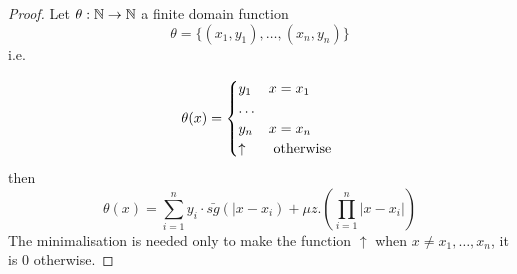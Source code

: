 \begin{proof}
  Let $\theta:\mathbb{N}\rightarrow\mathbb{N}$ a finite domain function
  \[
    \theta=\{(x_1,y_1),\dots,(x_n,y_n)\}
  \]
  i.e.
  
  \[
    \theta(x) = \begin{cases}
      y_1      & x=x_1         \\
      \dots                    \\
      y_n      & x=x_n         \\
      \uparrow & $ otherwise $
    \end{cases}
  \]
  then
  \[
    \theta(x) = \sum_{i=1}^{n}y_i \cdot \bar{sg}(|x-x_i) + \mu z. (\prod_{i=1}^{n}|x-x_i|)
  \]
  The minimalisation is needed only to make the function $\uparrow$ when $x\not= x_1,\dots,x_n$, it is $0$ otherwise.
\end{proof}